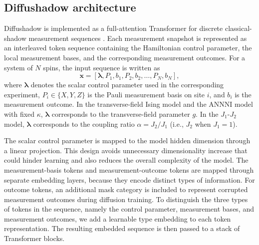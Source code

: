 \documentclass[pdflatex,sn-mathphys-num]{sn-jnl}%
\theoremstyle{thmstyleone}%
\theoremstyle{thmstyletwo}%
\theoremstyle{thmstylethree}%
\begin{document}
\subsection{Diffushadow architecture}
\label{sec:method_arch}


Diffushadow is implemented as a full-attention Transformer for discrete classical-shadow measurement sequences \cite{vaswani2017attention, huang2020predicting}. Each measurement snapshot is represented as an interleaved token sequence containing the Hamiltonian control parameter, the local measurement bases, and the corresponding measurement outcomes. For a system of \(N\) spins, the input sequence is written as
\begin{equation}
\mathbf{x}
=
[\boldsymbol{\lambda}, P_1, b_1, P_2, b_2, \ldots, P_N, b_N],
\end{equation}
where \(\boldsymbol{\lambda}\) denotes the scalar control parameter used in the corresponding experiment, \(P_i \in \{X,Y,Z\}\) is the Pauli measurement basis on site \(i\), and \(b_i\) is the measurement outcome. In the transverse-field Ising model and the ANNNI model with fixed \(\kappa\), \(\boldsymbol{\lambda}\) corresponds to the transverse-field parameter \(g\). In the \(J_1\)-\(J_2\) model, \(\boldsymbol{\lambda}\) corresponds to the coupling ratio \(\alpha=J_2/J_1\) (i.e., \(J_2\) when \(J_1=1\)).

The scalar control parameter is mapped to the model hidden dimension through a linear projection. This design avoids unnecessary dimensionality increase that could hinder learning and also reduces the overall complexity of the model. The measurement-basis tokens and measurement-outcome tokens are mapped through separate embedding layers, because they encode distinct types of information. For outcome tokens, an additional mask category is included to represent corrupted measurement outcomes during diffusion training. To distinguish the three types of tokens in the sequence, namely the control parameter, measurement bases, and measurement outcomes, we add a learnable type embedding to each token representation. The resulting embedded sequence is then passed to a stack of Transformer blocks.
\end{document}
